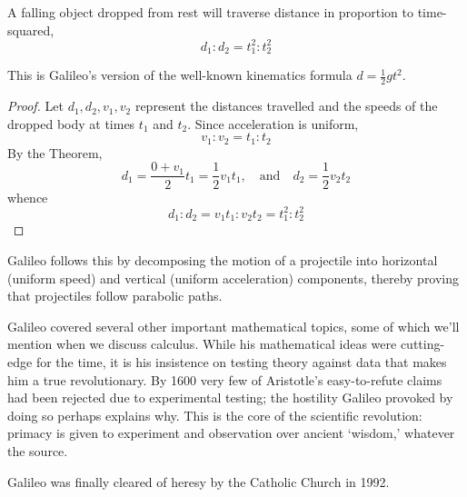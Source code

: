 \begin{cor*}{}{}
A falling object dropped from rest will traverse distance in proportion to time-squared,
\[d_1:d_2=t_1^2:t_2^2\]
\end{cor*}

This is Galileo's version of the well-known kinematics formula $d=\frac 12gt^2$.

\begin{proof}
Let $d_1,d_2,v_1,v_2$ represent the distances travelled and the speeds of the dropped body at times $t_1$ and $t_2$. Since acceleration is uniform,
\[v_1:v_2=t_1:t_2\]
By the Theorem,
\[d_1=\frac{0+v_1}2t_1=\frac 12v_1t_1,\quad\text{and}\quad d_2=\frac 12v_2t_2\]
whence
\[d_1:d_2=v_1t_1:v_2t_2=t_1^2:t_2^2\tag*{\qedhere}\]
\end{proof}

Galileo follows this by decomposing the motion of a projectile into horizontal (uniform speed) and vertical (uniform acceleration) components, thereby proving that projectiles follow parabolic paths.\smallbreak

Galileo covered several other important mathematical topics, some of which we'll mention when we discuss calculus. While his mathematical ideas were cutting-edge for the time, it is his insistence on testing theory against data that makes him a true revolutionary. By 1600 very few of Aristotle's easy-to-refute claims had been rejected due to experimental testing; the hostility Galileo provoked by doing so perhaps explains why. This is the core of the scientific revolution: primacy is given to experiment and observation over ancient `wisdom,' whatever the source.\smallbreak

Galileo was finally cleared of heresy by the Catholic Church in 1992.



